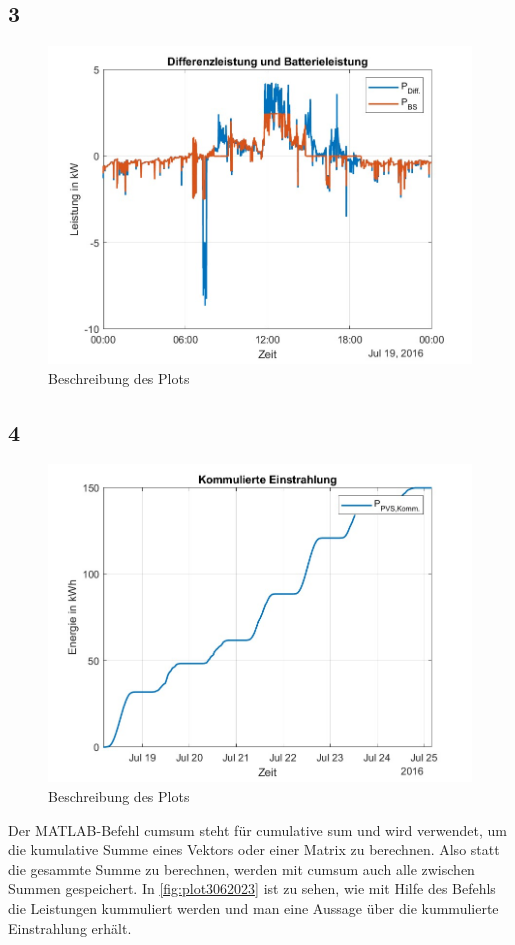 \subsection{3}
\begin{figure}[H]
    \centering
    \includegraphics[width=\textwidth]{Abbildungen/plot_vorbereitungsfrage3.jpg}
    \caption{Beschreibung des Plots}
    \label{fig:plot3062023}
\end{figure}
\subsection{4}
\begin{figure}[H]
    \centering
    \includegraphics[width=\textwidth]{Abbildungen/plot_vorbereitungsfrage4.jpg}
    \caption{Beschreibung des Plots}
    \label{fig:plot3062023}
\end{figure}
Der MATLAB-Befehl cumsum steht für cumulative sum und wird verwendet, um die kumulative Summe eines Vektors oder einer Matrix zu berechnen. 
Also statt die gesammte Summe zu berechnen, werden mit cumsum auch alle zwischen Summen gespeichert. In \autoref{fig:plot3062023} ist zu sehen, wie mit Hilfe des Befehls die Leistungen kummuliert werden und man eine Aussage über die kummulierte Einstrahlung erhält.